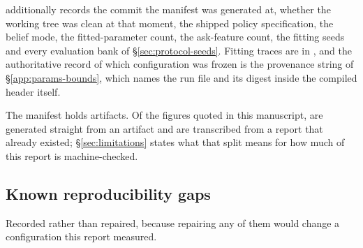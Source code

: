 



 additionally records the commit the
manifest was generated at, whether the working tree was clean at that moment, the
shipped policy specification, the belief mode, the fitted-parameter count, the
ask-feature count, the fitting seeds and every evaluation bank of
\S\ref{sec:protocol-seeds}. Fitting traces are in
, and the authoritative record of which
configuration was frozen is the provenance string of
\S\ref{app:params-bounds}, which names the run file and its digest inside the
compiled header itself.

The manifest holds \vsixManifestFiles{} artifacts. Of the figures quoted in this
manuscript, \vsixProvGenerated{} are generated straight from an artifact and
\vsixProvTranscribed{} are transcribed from a report that already existed;
\S\ref{sec:limitations} states what that split means for how much of this report
is machine-checked.

\subsection{Known reproducibility gaps}
\label{app:repro-gaps}

Recorded rather than repaired, because repairing any of them would change a
configuration this report measured.

